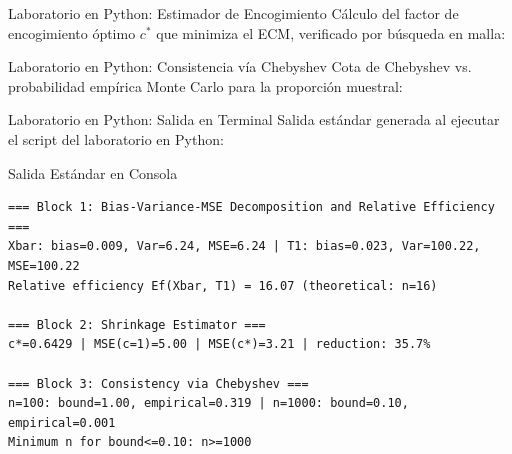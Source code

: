\documentclass[10pt, aspectratio=169]{beamer}
\begin{document}
\begin{frame}[fragile]{Laboratorio en Python: Estimador de Encogimiento}
  \scriptsize
  Cálculo del factor de encogimiento óptimo $c^*$ que minimiza el ECM, verificado por búsqueda en malla:
  {
  }
\end{frame}

\begin{frame}[fragile]{Laboratorio en Python: Consistencia vía Chebyshev}
  \scriptsize
  Cota de Chebyshev vs. probabilidad empírica Monte Carlo para la proporción muestral:
  {
  }
\end{frame}

\begin{frame}[fragile]{Laboratorio en Python: Salida en Terminal}
  \scriptsize
  Salida estándar generada al ejecutar el script del laboratorio en Python:
  \vspace{0.02cm}
  \begin{block}{Salida Estándar en Consola}
    \fontsize{4pt}{5pt}\selectfont
    \begin{verbatim}
=== Block 1: Bias-Variance-MSE Decomposition and Relative Efficiency ===
Xbar: bias=0.009, Var=6.24, MSE=6.24 | T1: bias=0.023, Var=100.22, MSE=100.22
Relative efficiency Ef(Xbar, T1) = 16.07 (theoretical: n=16)

=== Block 2: Shrinkage Estimator ===
c*=0.6429 | MSE(c=1)=5.00 | MSE(c*)=3.21 | reduction: 35.7%

=== Block 3: Consistency via Chebyshev ===
n=100: bound=1.00, empirical=0.319 | n=1000: bound=0.10, empirical=0.001
Minimum n for bound<=0.10: n>=1000
    \end{verbatim}
  \end{block}
\end{frame}
\end{document}

